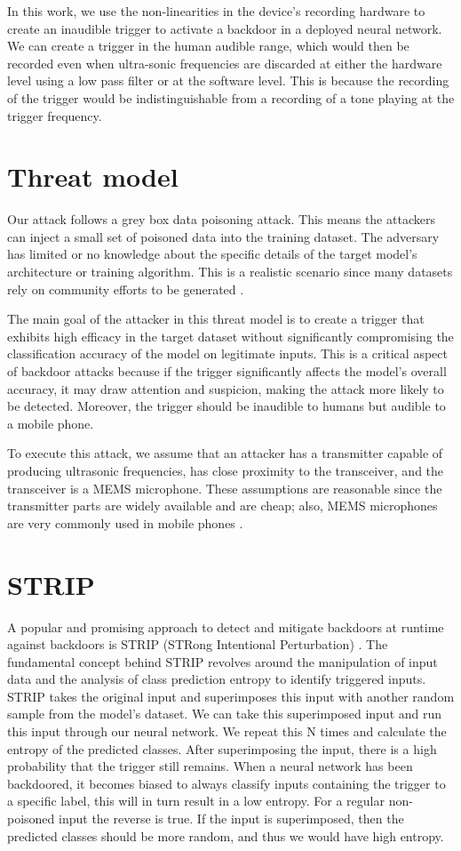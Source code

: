 \documentclass{report}
\theoremstyle{definition}
\theoremstyle{remark}
\begin{document}
In this work, we use the non-linearities in the device's recording hardware to create an inaudible trigger to activate a backdoor in a deployed neural network. We can create a trigger in the human audible range, which would then be recorded even when ultra-sonic frequencies are discarded at either the hardware level using a low pass filter or at the software level. This is because the recording of the trigger would be indistinguishable from a recording of a tone playing at the trigger frequency.
 
\section{Threat model}
Our attack follows a grey box data poisoning attack. This means the attackers can inject a small set of poisoned data into the training dataset. The adversary has limited or no knowledge about the specific details of the target model's architecture or training algorithm. This is a realistic scenario since many datasets rely on community efforts to be generated \cite{Speech_commands} \cite{CommonVoice}.

The main goal of the attacker in this threat model is to create a trigger that exhibits high efficacy in the target dataset without significantly compromising the classification accuracy of the model on legitimate inputs. This is a critical aspect of backdoor attacks because if the trigger significantly affects the model's overall accuracy, it may draw attention and suspicion, making the attack more likely to be detected. Moreover, the trigger should be inaudible to humans but audible to a mobile phone.

To execute this attack, we assume that an attacker has a transmitter capable of producing ultrasonic frequencies, has close proximity to the transceiver, and the transceiver is a MEMS microphone. These assumptions are reasonable since the transmitter parts are widely available and are cheap; also, MEMS microphones are very commonly used in mobile phones \cite{7180939}. 

\section{STRIP}
A popular and promising approach to detect and mitigate backdoors at runtime against backdoors is STRIP (STRong Intentional Perturbation) \cite{Strip}. The fundamental concept behind STRIP revolves around the manipulation of input data and the analysis of class prediction entropy to identify triggered inputs. STRIP takes the original input and superimposes this input with another random sample from the model's dataset. We can take this superimposed input and run this input through our neural network. We repeat this N times and calculate the entropy of the predicted classes. After superimposing the input, there is a high probability that the trigger still remains. When a neural network has been backdoored, it becomes biased to always classify inputs containing the trigger to a specific label, this will in turn result in a low entropy. For a regular non-poisoned input the reverse is true. If the input is superimposed, then the predicted classes should be more random, and thus we would have high entropy. 
\end{document}
